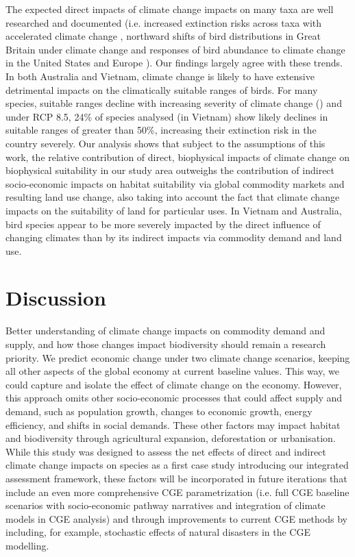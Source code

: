 \documentclass[titlesmallcaps,copyrightpage]{uomthesis}\usepackage[]{graphicx}\usepackage[]{color}
\begin{document}
The expected direct impacts of climate change impacts on many taxa are well researched and documented (i.e. increased extinction risks across taxa with accelerated climate change \citep{urban_accelerating_2015}, northward shifts of bird distributions in Great Britain under climate change \citep{gillings_directionality_2015} and responses of bird abundance to climate change in the United States and Europe \citep{stephens_consistent_2016}). Our findings largely agree with these trends. In both Australia and Vietnam, climate change is likely to have extensive detrimental impacts on the climatically suitable ranges of birds. For many species, suitable ranges decline with increasing severity of climate change () and under RCP 8.5, 24\% of species analysed (in Vietnam) show likely declines in suitable ranges of greater than 50\%, increasing their extinction risk in the country severely. Our analysis shows that subject to the assumptions of this work, the relative contribution of direct, biophysical impacts of climate change on biophysical suitability in our study area outweighs the contribution of indirect socio-economic impacts on habitat suitability via global commodity markets and resulting land use change, also taking into account the fact that climate change impacts on the suitability of land for particular uses. In Vietnam and Australia, bird species appear to be more severely impacted by the direct influence of changing climates than by its indirect impacts via commodity demand and land use.

\section{Discussion}

Better understanding of climate change impacts on commodity demand and supply, and how those changes impact biodiversity should remain a research priority.
We predict economic change under two climate change scenarios, keeping all other aspects of the global economy at current baseline values. This way, we could capture and isolate the effect of climate change on the economy. However, this approach omits other socio-economic processes that could affect supply and demand, such as population growth, changes to economic growth, energy efficiency, and shifts in social demands. These other factors may impact habitat and biodiversity through agricultural expansion, deforestation or urbanisation. While this study was designed to assess the net effects of direct and indirect climate change impacts on species as a first case study introducing our integrated assessment framework, these factors will be incorporated in future iterations that include an even more comprehensive CGE parametrization (i.e. full CGE baseline scenarios with socio-economic pathway narratives \citep{van_vuuren_climate_2014} and integration of climate models in CGE analysis) and through improvements to current CGE methods by including, for example, stochastic effects of natural disasters in the CGE modelling.
\end{document}
